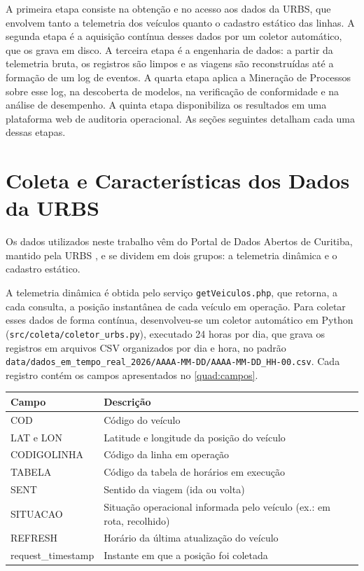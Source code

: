A primeira etapa consiste na obtenção e no acesso aos dados da URBS, que envolvem tanto a telemetria dos veículos quanto o cadastro estático das linhas. A segunda etapa é a aquisição contínua desses dados por um coletor automático, que os grava em disco. A terceira etapa é a engenharia de dados: a partir da telemetria bruta, os registros são limpos e as viagens são reconstruídas até a formação de um log de eventos. A quarta etapa aplica a Mineração de Processos sobre esse log, na descoberta de modelos, na verificação de conformidade e na análise de desempenho. A quinta etapa disponibiliza os resultados em uma plataforma web de auditoria operacional. As seções seguintes detalham cada uma dessas etapas.

\section{Coleta e Características dos Dados da URBS}\label{sec:dadosURBS}

Os dados utilizados neste trabalho vêm do Portal de Dados Abertos de Curitiba, mantido pela URBS \cite{urbs2024}, e se dividem em dois grupos: a telemetria dinâmica e o cadastro estático.

A telemetria dinâmica é obtida pelo serviço \texttt{getVeiculos.php}, que retorna, a cada consulta, a posição instantânea de cada veículo em operação. Para coletar esses dados de forma contínua, desenvolveu-se um coletor automático em Python (\texttt{src/coleta/coletor\_urbs.py}), executado 24 horas por dia, que grava os registros em arquivos CSV organizados por dia e hora, no padrão \texttt{data/dados\_em\_tempo\_real\_2026/AAAA-MM-DD/AAAA-MM-DD\_HH-00.csv}. Cada registro contém os campos apresentados no \autoref{quad:campos}.

\begin{tabframed}[htb]
\caption{Campos da telemetria bruta dos veículos}
\label{quad:campos}
\begin{tabular}{|p{3.2cm}|p{10.5cm}|}
\hline
\textbf{Campo} & \textbf{Descrição} \\ \hline
COD & Código do veículo \\ \hline
LAT e LON & Latitude e longitude da posição do veículo \\ \hline
CODIGOLINHA & Código da linha em operação \\ \hline
TABELA & Código da tabela de horários em execução \\ \hline
SENT & Sentido da viagem (ida ou volta) \\ \hline
SITUACAO & Situação operacional informada pelo veículo (ex.: em rota, recolhido) \\ \hline
REFRESH & Horário da última atualização do veículo \\ \hline
request\_timestamp & Instante em que a posição foi coletada \\ \hline
\end{tabular}
\fonte{}
\end{tabframed}

